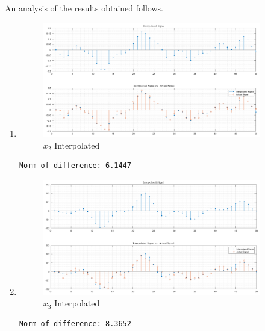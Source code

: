 \documentclass{article}[a4paper]
\begin{document}
	An analysis of the results obtained follows.
	\newpage
	\begin{enumerate}[label=(\alph*)]
		\item \phantom{a}
		\begin{figure}[H]
			\centering
			\includegraphics[width=0.9\textwidth]{images/q2_x2_interp.png}
			\caption{$x_2$ Interpolated}
			\label{x2_interp}
		\end{figure}
		
		\begin{lstlisting}[caption={Code output, $\rVert x_2 - x \lVert$}, label=x2_x_norm]
Norm of difference: 6.1447
		\end{lstlisting}
		
		\item \phantom{a}
		\begin{figure}[H]
			\centering
			\includegraphics[width=0.9\textwidth]{images/q2_x3_interp.png}
			\caption{$x_3$ Interpolated}
			\label{x3_interp}
		\end{figure}
		\newpage
		\begin{lstlisting}[caption={Code output, $\rVert x_3 - x \lVert$}, label=x3_x_norm]
Norm of difference: 8.3652
		\end{lstlisting}
		

\end{enumerate}
\end{document}
